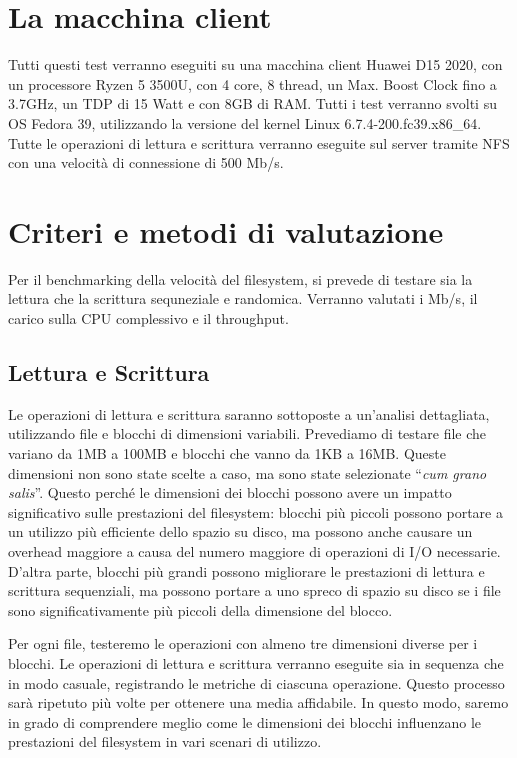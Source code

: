 \section{La macchina client}
Tutti questi test verranno eseguiti su una macchina client Huawei D15 2020, con un processore Ryzen 5 3500U, con 4 core, 8 thread, un Max. Boost Clock fino a 3.7GHz, un TDP di 15 Watt e con 8GB di RAM. Tutti i test verranno svolti su OS Fedora 39, utilizzando la versione del kernel Linux 6.7.4-200.fc39.x86\_64. Tutte le operazioni di lettura e scrittura verranno eseguite sul server tramite NFS con una velocità di connessione di 500 Mb/s.

\section{Criteri e metodi di valutazione} 
Per il benchmarking della velocità del filesystem, si prevede di testare sia la lettura che la scrittura sequneziale e randomica. Verranno valutati i Mb/s, il carico sulla CPU complessivo e il throughput.

\subsection{Lettura e Scrittura}
Le operazioni di lettura e scrittura saranno sottoposte a un’analisi dettagliata, utilizzando file e blocchi di dimensioni variabili. Prevediamo di testare file che variano da 1MB a 100MB e blocchi che vanno da 1KB a 16MB. Queste dimensioni non sono state scelte a caso, ma sono state selezionate “\textit{cum grano salis}”. Questo perché le dimensioni dei blocchi possono avere un impatto significativo sulle prestazioni del filesystem: blocchi più piccoli possono portare a un utilizzo più efficiente dello spazio su disco, ma possono anche causare un overhead maggiore a causa del numero maggiore di operazioni di I/O necessarie. D’altra parte, blocchi più grandi possono migliorare le prestazioni di lettura e scrittura sequenziali, ma possono portare a uno spreco di spazio su disco se i file sono significativamente più piccoli della dimensione del blocco.

Per ogni file, testeremo le operazioni con almeno tre dimensioni diverse per i blocchi. Le operazioni di lettura e scrittura verranno eseguite sia in sequenza che in modo casuale, registrando le metriche di ciascuna operazione. Questo processo sarà ripetuto più volte per ottenere una media affidabile. In questo modo, saremo in grado di comprendere meglio come le dimensioni dei blocchi influenzano le prestazioni del filesystem in vari scenari di utilizzo.

